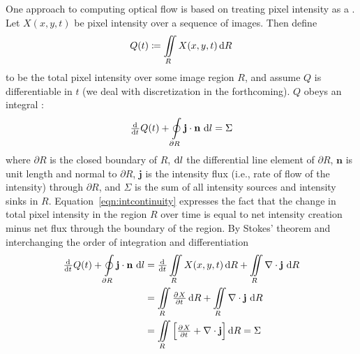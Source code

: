 One approach to computing optical flow is based on treating pixel intensity as a .
%
Let \(X(x,y,t)\) be pixel intensity over a sequence of images.
%
Then define
\begin{equation*}
	Q(t) \coloneqq \iint\limits_R X(x,y,t) \dif R
\end{equation*}
to be the total pixel intensity over some image region \(R\), and assume \(Q\) is differentiable in \(t\) (we deal with discretization in the forthcoming).
%
\(Q\) obeys an integral :
\begin{equation}
	\od{}{t} Q(t) + \oint\limits_{\partial R} \mathbf{j} \cdot \mathbf{n}\, \dif l = \Sigma
	\label{eqn:intcontinuity}
\end{equation}
where \(\partial R\) is the closed boundary of \(R\), \(\dif l\) the differential line element of \(\partial R\), \(\mathbf{n}\) is unit length and normal to \(\partial R\), \(\mathbf{j}\) is the intensity flux (i.e., rate of flow of the intensity) through \(\partial R\), and \(\Sigma\) is the sum of all intensity sources and intensity sinks in \(R\).
%
Equation~\eqref{eqn:intcontinuity} expresses the fact that the change in total pixel intensity in the region \(R\) over time is equal to net intensity creation minus net flux through the boundary of the region.
%
By Stokes' theorem and interchanging the order of integration and differentiation
\begin{align*}
	\od{}{t} Q(t) + \oint\limits\limits_{\partial R} \mathbf{j} \cdot \mathbf{n}\, \dif l & = \od{}{t} \iint\limits_R X(x,y,t) \dif R + \iint\limits_R \nabla \cdot \mathbf{j}\, \dif R \\
	                                                                                      & = \iint\limits_R \pd{X}{t} \dif R + \iint\limits_R \nabla \cdot \mathbf{j}\, \dif R         \\
	                                                                                      & = \iint\limits_R \left[ \pd{X}{t} + \nabla \cdot \mathbf{j} \right]  \dif R = \Sigma
\end{align*}
